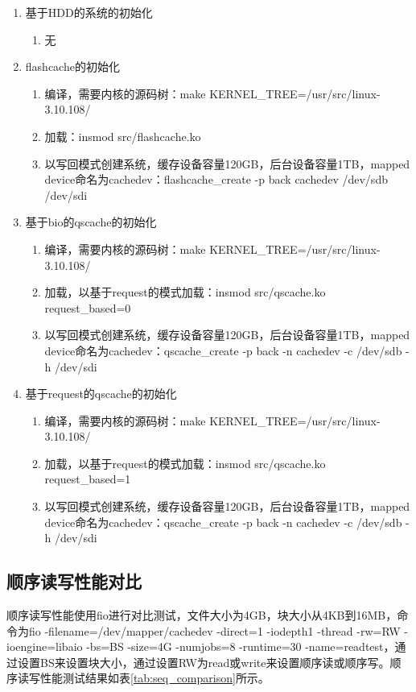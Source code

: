 \begin{enumerate}
    \item 基于HDD的系统的初始化
          \begin{enumerate}
              \item 无
          \end{enumerate}
    \item flashcache的初始化
    \begin{enumerate}
        \item 编译，需要内核的源码树：make KERNEL\_TREE=/usr/src/linux-3.10.108/
        \item 加载：insmod src/flashcache.ko
        \item 以写回模式创建系统，缓存设备容量120GB，后台设备容量1TB，mapped device命名为cachedev：flashcache\_create -p back cachedev /dev/sdb /dev/sdi
    \end{enumerate}
    \item 基于bio的qscache的初始化
    \begin{enumerate}
        \item 编译，需要内核的源码树：make KERNEL\_TREE=/usr/src/linux-3.10.108/
        \item 加载，以基于request的模式加载：insmod src/qscache.ko request\_based=0
        \item 以写回模式创建系统，缓存设备容量120GB，后台设备容量1TB，mapped device命名为cachedev：qscache\_create -p back -n cachedev -c /dev/sdb -h /dev/sdi
    \end{enumerate}
    \item 基于request的qscache的初始化
    \begin{enumerate}
        \item 编译，需要内核的源码树：make KERNEL\_TREE=/usr/src/linux-3.10.108/
        \item 加载，以基于request的模式加载：insmod src/qscache.ko request\_based=1
        \item 以写回模式创建系统，缓存设备容量120GB，后台设备容量1TB，mapped device命名为cachedev：qscache\_create -p back -n cachedev -c /dev/sdb -h /dev/sdi
    \end{enumerate}
\end{enumerate}

\subsection{顺序读写性能对比}

顺序读写性能使用fio进行对比测试，文件大小为4GB，块大小从4KB到16MB，命令为fio -filename=/dev/mapper/cachedev -direct=1 -iodepth1 -thread -rw=RW -ioengine=libaio -bs=BS -size=4G -numjobs=8 -runtime=30 -name=readtest，通过设置BS来设置块大小，通过设置RW为read或write来设置顺序读或顺序写。顺序读写性能测试结果如表\ref{tab:seq_comparison}所示。

